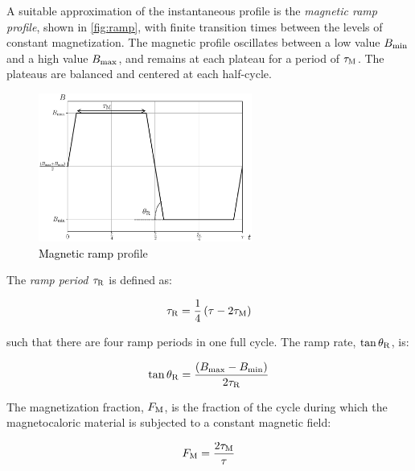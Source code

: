 \documentclass[referee]{svjour3}
\begin{document}
A suitable approximation of the instantaneous profile is the \emph{magnetic ramp profile}, shown in \autoref{fig:ramp}, with finite transition times between the levels of constant magnetization. The magnetic profile oscillates  between a low value \({B}_{\mathrm{min}}\) and a high value \({B}_{\mathrm{max}}\), and remains at each plateau for a period of \(\tau_{\mathrm{M}}\). The plateaus are balanced and centered at each half-cycle.

\begin{figure}[!ht]
  \centering
  \includegraphics[width=7cm]{Fig4-profile_rm}
  \caption{\textcolor{black}{Magnetic ramp}  profile}
  \label{fig:ramp}
\end{figure}

The \emph{ramp period} \(\tau_{\mathrm{R}}\) is defined as:

\begin{equation}
\label{eq:201}
\tau_{\mathrm{R}} = \frac{1}{4}\left(\tau - 2 \tau_{\mathrm{M}}\right)
\end{equation}

\noindent such that there are four ramp periods in one full cycle. The ramp rate, \(\tan \theta_{\mathrm{R}}\), is:

\begin{equation}
\label{eq:202}
\tan \theta_{\mathrm{R}} = \frac{\left({B}_{\mathrm{max}} - {B}_{\mathrm{min}}\right)}{2\tau_{\mathrm{R}}}
\end{equation}


The magnetization fraction, \(F_{\mathrm{M}}\), is the fraction of the cycle during which the magnetocaloric material is subjected to a constant magnetic field:

\begin{equation}
\label{eq:204}
F_{\mathrm{M}} = \frac{2\tau_{\mathrm{M}}}{\tau}
\end{equation}
\end{document}
